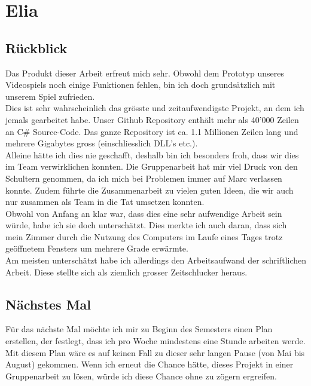 \chapter{Elia}

\section{Rückblick}
Das Produkt dieser Arbeit erfreut mich sehr. Obwohl dem Prototyp unseres Videospiels noch einige Funktionen fehlen, bin ich doch grundsätzlich mit unserem Spiel zufrieden. \\
Dies ist sehr wahrscheinlich das grösste und zeitaufwendigste Projekt, an dem ich jemals gearbeitet habe. Unser Github Repository enthält mehr als 40'000 Zeilen an C\# Source-Code.
Das ganze Repository ist ca. 1.1 Millionen Zeilen lang und mehrere Gigabytes gross (einschliesslich DLL's etc.). \\
Alleine hätte ich dies nie geschafft, deshalb bin ich besonders froh, dass wir dies im Team verwirklichen konnten. Die Gruppenarbeit hat mir viel Druck von den Schultern genommen, da ich mich bei Problemen immer auf Marc
verlassen konnte. Zudem führte die Zusammenarbeit zu vielen guten Ideen, die wir auch nur zusammen als Team in die Tat umsetzen konnten. 
\\
Obwohl von Anfang an klar war, dass dies eine sehr aufwendige Arbeit sein würde, habe ich sie doch unterschätzt. Dies merkte ich auch daran, dass sich mein Zimmer durch die Nutzung des Computers im Laufe eines Tages
trotz geöffnetem Fensters um mehrere Grade erwärmte.\\
Am meisten unterschätzt habe ich allerdings den Arbeitsaufwand der schriftlichen Arbeit. Diese stellte sich als ziemlich grosser Zeitschlucker heraus. 

\section{Nächstes Mal}
Für das nächste Mal möchte ich mir zu Beginn des Semesters einen Plan erstellen, der festlegt, dass ich pro Woche mindestens eine Stunde arbeiten werde. Mit diesem Plan wäre es auf keinen Fall zu dieser sehr langen
Pause (von Mai bis August) gekommen. Wenn ich erneut die Chance hätte, dieses Projekt in einer Gruppenarbeit zu lösen, würde ich diese Chance ohne zu zögern ergreifen. 